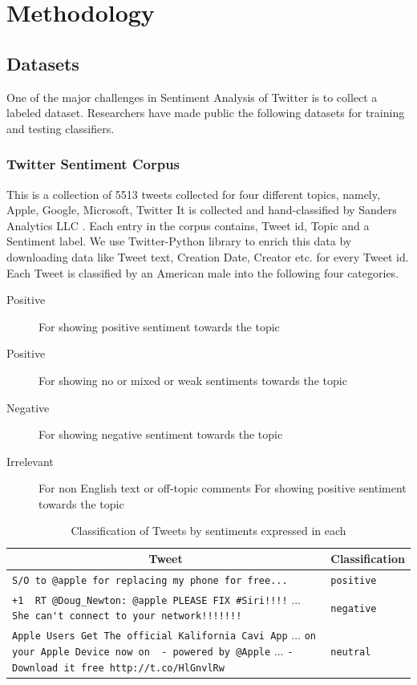 \section{Methodology}

\subsection{Datasets}
One of the major challenges in Sentiment Analysis of Twitter is to collect a labeled dataset.
Researchers have made public the following datasets for training and testing classifiers.

\subsubsection{Twitter Sentiment Corpus}
This is a collection of 5513 tweets collected for four different topics, namely, Apple, Google, Microsoft, Twitter
It is collected and hand-classified by Sanders Analytics LLC \cite{SA}.
Each entry in the corpus contains, Tweet id, Topic and a Sentiment label.
We use Twitter-Python library to enrich this data by downloading data like Tweet text, Creation Date, Creator etc. for every Tweet id. %
Each Tweet is classified by an American male into the following four categories.

\begin{description}
	\item[Positive] {For showing positive sentiment towards the topic}
	\item[Positive] {For showing no or mixed or weak sentiments towards the topic}
	\item[Negative] {For showing negative sentiment towards the topic}	
	\item[Irrelevant] {For non English text or off-topic comments}
	{For showing positive sentiment towards the topic}
\end{description}

\begin{table}[h]
\centering
	\begin{tabular}{| p{} | l | }
	\hline
		\multicolumn{1}{|c|}{Tweet} &
		\multicolumn{1}{|c|}{Classification} \\
	\hline
	\verb'S/O to @apple for replacing my phone for free...' &  \verb'positive' \\ \hline
	
	\verb"+1  RT @Doug_Newton: @apple PLEASE FIX #Siri!!!!" {...}
	\verb"She can't connect to your network!!!!!!!" &  \verb'negative' \\ \hline
	
	\verb'Apple Users Get The official Kalifornia Cavi App' {...}
	\verb'on your Apple Device now on  - powered by @Apple' {...}
	\verb'- Download it free http://t.co/HlGnvlRw' &  \verb'neutral' \\ \hline
	
	\end{tabular}
\caption{Classification of Tweets by sentiments expressed in each}
\label{table:twt}
\end{table}

